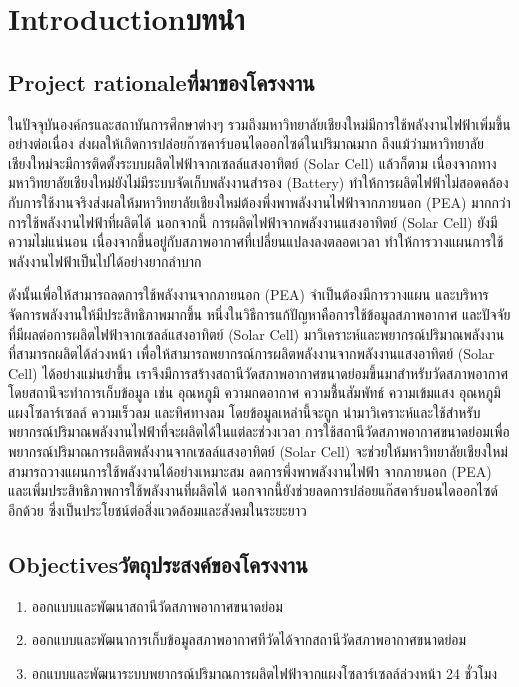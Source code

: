 \chapter{\ifenglish Introduction\else บทนำ\fi}
\sloppy

\section{\ifenglish Project rationale\else ที่มาของโครงงาน\fi}

\hspace{\parindent}ในปัจจุบันองค์กรและสถาบันการศึกษาต่างๆ รวมถึงมหาวิทยาลัยเชียงใหม่มีการใช้พลังงานไฟฟ้าเพิ่มขึ้นอย่างต่อเนื่อง ส่งผลให้เกิดการปล่อยก๊าซคาร์บอนไดออกไซด์ในปริมาณมาก ถึงแม้ว่ามหาวิทยาลัยเชียงใหม่จะมีการติดตั้งระบบผลิตไฟฟ้าจากเซลล์แสงอาทิตย์ (Solar Cell) แล้วก็ตาม 
เนื่องจากทางมหาวิทยาลัยเชียงใหม่ยังไม่มีระบบจัดเก็บพลังงานสำรอง (Battery) 
ทำให้การผลิตไฟฟ้าไม่สอดคล้องกับการใช้งานจริงส่งผลให้มหาวิทยาลัยเชียงใหม่ต้องพึ่งพาพลังงานไฟฟ้าจากภายนอก (PEA) มากกว่าการใช้พลังงานไฟฟ้าที่ผลิตได้ นอกจากนี้ การผลิตไฟฟ้าจากพลังงานแสงอาทิตย์ 
(Solar Cell) ยังมีความไม่แน่นอน เนื่องจากขึ้นอยู่กับสภาพอากาศที่เปลี่ยนแปลงลงตลอดเวลา
ทำให้การวางแผนการใช้พลังงานไฟฟ้าเป็นไปได้อย่างยากลำบาก 

ดังนั้นเพื่อให้สามารถลดการใช้พลังงานจากภายนอก (PEA) จำเป็นต้องมีการวางแผน 
และบริหารจัดการพลังงานให้มีประสิทธิภาพมากขึ้น หนึ่งในวิธีการแก้ปัญหาคือการใช้ข้อมูลสภาพอากาศ 
และปัจจัยที่มีผลต่อการผลิตไฟฟ้าจากเซลล์แสงอาทิตย์ (Solar Cell) มาวิเคราะห์และพยากรณ์ปริมาณพลังงานที่สามารถผลิตได้ล่วงหน้า  
เพื่อให้สามารถพยากรณ์การผลิตพลังงานจากพลังงานแสงอาทิตย์ (Solar Cell) ได้อย่างแม่นยำขึ้น 
เราจึงมีการสร้างสถานีวัดสภาพอากาศขนาดย่อมขึ้นมาสำหรับวัดสภาพอากาศ โดยสถานีจะทำการเก็บข้อมูล 
เช่น อุณหภูมิ ความกดอากาศ ความชื้นสัมพัทธ์ ความเข้มแสง อุณหภูมิแผงโซลาร์เซลล์ ความเร็วลม และทิศทางลม โดยข้อมูลเหล่านี้จะถูก 
นำมาวิเคราะห์และใช้สำหรับพยากรณ์ปริมาณพลังงานไฟฟ้าที่จะผลิตได้ในแต่ละช่วงเวลา 
การใช้สถานีวัดสภาพอากาศขนาดย่อมเพื่อพยากรณ์ปริมาณการผลิตพลังงานจากเซลล์แสงอาทิตย์ 
(Solar Cell) จะช่วยให้มหาวิทยาลัยเชียงใหม่สามารถวางแผนการใช้พลังงานได้อย่างเหมาะสม 
ลดการพึ่งพาพลังงานไฟฟ้า จากภายนอก (PEA) และเพิ่มประสิทธิภาพการใช้พลังงานที่ผลิตได้ 
นอกจากนี้ยังช่วยลดการปล่อยแก๊สคาร์บอนไดออกไซด์อีกด้วย ซึ่งเป็นประโยชน์ต่อสิ่งแวดล้อมและสังคมในระยะยาว


\section{\ifenglish Objectives\else วัตถุประสงค์ของโครงงาน\fi}
\begin{enumerate}
    \item ออกแบบและพัฒนาสถานีวัดสภาพอากาศขนาดย่อม
    \item ออกแบบและพัฒนาการเก็บข้อมูลสภาพอากาศทีวัดได้จากสถานีวัดสภาพอากาศขนาดย่อม
    \item อกแบบและพัฒนาระบบพยากรณ์ปริมาณการผลิตไฟฟ้าจากแผงโซลาร์เซลล์ล่วงหน้า 24 ชั่วโมง
\end{enumerate}




